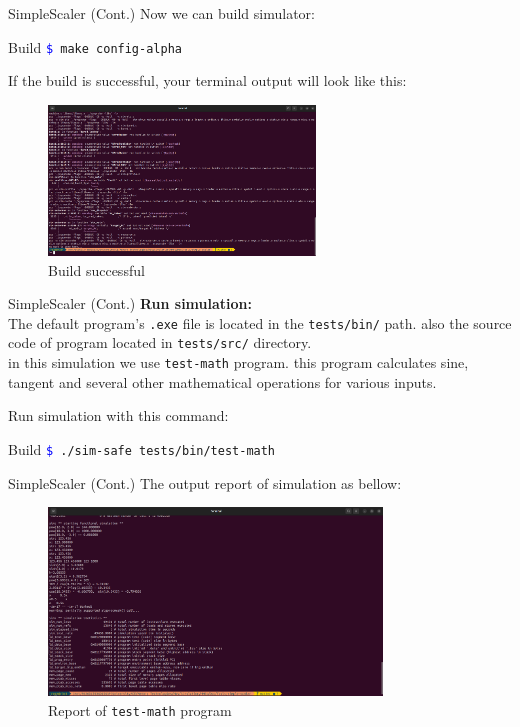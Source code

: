 \documentclass{beamer}
\begin{document}
\begin{frame}{SimpleScaler (Cont.)}
	Now we can build simulator:
	\begin{block}{Build}
		\texttt{\textcolor{blue}{\$} make config-alpha‬‬‬‬} \\
	\end{block}
	If the build is successful, your terminal output will look like this:
	
	\begin{figure}
		\centering
		\includegraphics[height=4cm]{images/img17}
		\caption{Build successful}
		\label{fig:Build successful}
	\end{figure}
\end{frame}




\begin{frame}{SimpleScaler (Cont.)}
	\textbf{Run simulation:}\\
	The default program's \texttt{.exe} file is located in the \texttt{tests/bin/} path. also the source code of program located in \texttt{tests/src/} directory.\\
	
	in this simulation we use \texttt{test-math} program. this program calculates sine, tangent and several other mathematical operations for various inputs.
	
	Run simulation with this command:
	\begin{block}{Build}
		\texttt{\textcolor{blue}{\$} ./sim-safe tests/bin/test-math} \\
	\end{block}
\end{frame}



\begin{frame}{SimpleScaler (Cont.)}
	The output report of simulation as bellow:
	
	\begin{figure}
		\centering
		\includegraphics[height=5cm]{images/img18}
		\caption{Report of \texttt{test-math} program}
		\label{fig:Report of test-math program}
	\end{figure}
	
\end{frame}
\end{document}

